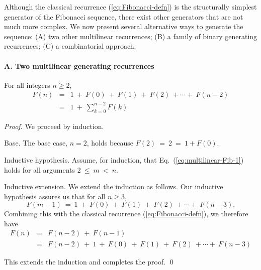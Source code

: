 Although the classical recurrence (\ref{eq:Fibonacci-defn}) is the structurally simplest generator of the Fibonacci sequence, there exist other generators that are not much more complex.  We now present several alternative ways to generate the sequence: (A) two other multilinear recurrences; (B) a family of binary generating recurrences; (C) a combinatorial approach.

\paragraph{A. Two multilinear generating recurrences}


\begin{prop}
\label{thm:FiboSum-1}
For all integers $n \geq 2$,
\begin{eqnarray}
\label{eq:multilinear-Fib-1}
F(n) & = &
1 \ + \ F(0) \ + \ F(1) \ + \ F(2) \ + \cdots + \ F(n-2) \\
\nonumber
     & = &
1 \ + \ \sum_{k=0}^{n-2} F(k)
\end{eqnarray}
\end{prop}

\begin{proof}
We proceed by induction.

\smallskip

\noindent
{\sf Base}. The base case, $n=2$, holds because $F(2) \ = \ 2 \ = \ 1 + F(0)$.

\smallskip

\noindent 
{\sf Inductive hypothesis}.
Assume, for induction, that Eq.~(\ref{eq:multilinear-Fib-1}) holds for all arguments $2 \ \leq \ m  \ < \ n$.

\smallskip

\noindent 
{\sf Inductive extension}.
We extend the induction as follows.  Our inductive hypothesis assures us that for all $n \geq 3$,
\[ F(m-1) \ = \ 1 \ + \ F(0) \ + \ F(1) \ + \ F(2) \ + \cdots + \ F(n-3). \]
Combining this with the classical recurrence (\ref{eq:Fibonacci-defn}), we therefore have
\begin{eqnarray*}
F(n) & = & F(n-2) \ + \ F(n-1) \\
     & = &
F(n-2) \ + \ 1 \ + \ F(0) \ + \ F(1) \ + \ F(2) \ + \cdots + \ F(n-3)
\end{eqnarray*}

\noindent
This extends the induction and completes the proof.
\qed
\end{proof}

